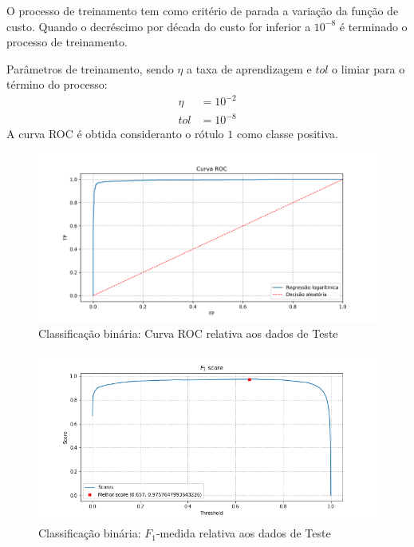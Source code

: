\documentclass{article}
\begin{document}
        O processo de treinamento tem como critério de parada a variação da função de custo. Quando
        o decréscimo por década do custo for inferior a $10^{-8}$ é terminado o processo de treinamento.

        Parâmetros de treinamento, sendo $\eta$ a taxa de aprendizagem e $tol$ o limiar para o término do processo:
        \begin{align*}
            \eta&=10^{-2} \\
            tol&=10^{-8}
        \end{align*}
        A curva ROC é obtida consideranto o rótulo $1$ como classe positiva.
        \begin{figure}[H]
            \centering
            \includegraphics[width=\textwidth]{img1/roc.png}
            \caption{Classificação binária: Curva ROC relativa aos dados de Teste}
            \label{fig:a_roc}
        \end{figure}
        \begin{figure}[H]
            \centering
            \includegraphics[width=\textwidth]{img1/f1_score.png}
            \caption{Classificação binária: $F_1$-medida relativa aos dados de Teste}
            \label{fig:a_fi_score}
        \end{figure}
    
\end{document}

